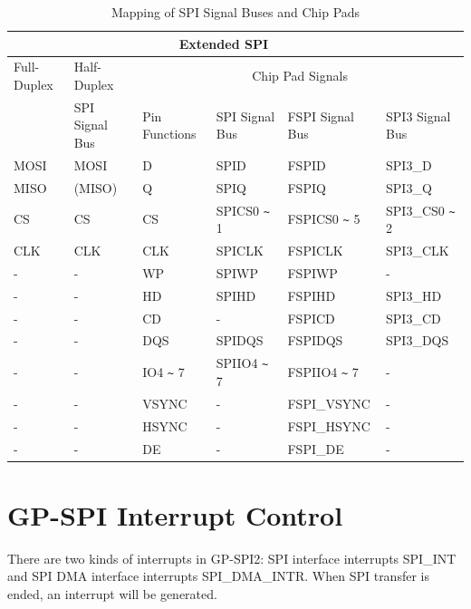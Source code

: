 \documentclass[main\_\_EN.tex]{subfiles}
\begin{document}
\begin{longtable}[c]{|p{2.0cm}|p{2.0cm}|p{2.0cm}|p{2.5cm}|p{2.5cm}|p{2.5cm}|}    \caption{Mapping of SPI Signal Buses and Chip Pads}
\label{table:SPI_signals}\\
\hline
    \rowcolor{lightgray}
    \multicolumn{2}{c|}{Standard SPI} & \multicolumn{4}{c|}{Extended SPI}\\
    \hline
    \rowcolor{lightgray}
    Full-Duplex & Half-Duplex & \multicolumn{4}{c|}{Chip Pad Signals}\\
    \hline
    \rowcolor{lightgray}
    \multirow{-1}{*}{SPI Signal Bus} & \multirow{-1}{*}{SPI Signal Bus} & \multirow{-1}{*}{Pin Functions} & SPI Signal Bus & FSPI Signal Bus & SPI3 Signal Bus \\
    \hline
    MOSI & MOSI   & D  & SPID             & FSPID  & SPI3\_D \\
    \hline
    MISO & (MISO) & Q  & SPIQ             & FSPIQ  & SPI3\_Q \\
    \hline
      CS & CS     & CS & SPICS0  \verb+~+ 1  & FSPICS0  \verb+~+ 5
                  & SPI3\_CS0 \verb+~+ 2  \\
    \hline
     CLK & CLK    & CLK& SPICLK           & FSPICLK& SPI3\_CLK \\
    \hline
       - & -      & WP & SPIWP            & FSPIWP & -        \\
    \hline
       - & -      & HD & SPIHD            & FSPIHD & SPI3\_HD \\
    \hline
       - & -      & CD & -               & FSPICD & SPI3\_CD \\
    \hline
       - & -      & DQS & SPIDQS         & FSPIDQS & SPI3\_DQS \\
    \hline
       - & -      & IO4 \verb+~+ 7 & SPIIO4 \verb+~+ 7   & FSPIIO4 \verb+~+ 7 & - \\
    \hline
       - & -      & VSYNC & -      & FSPI\_VSYNC & - \\
    \hline
       - & -      & HSYNC & -      & FSPI\_HSYNC & - \\
    \hline
       - & -      & DE    & -      & FSPI\_DE & - \\
    \hline
\end{longtable}

\section{GP-SPI Interrupt Control} \label{Section:SPI_Interrupt}

There are two kinds of interrupts in GP-SPI2: SPI interface interrupts SPI\_INT and SPI DMA interface interrupts SPI\_DMA\_INTR. When SPI transfer is ended, an interrupt will be generated.
\end{document}
